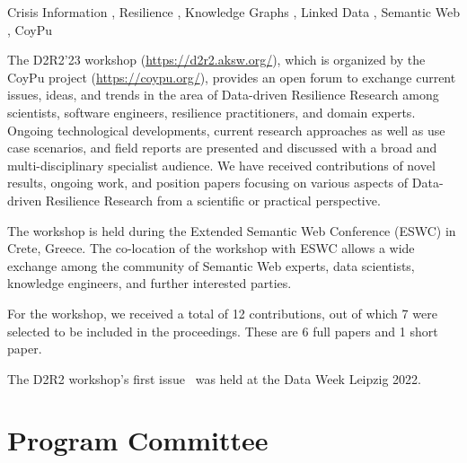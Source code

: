 \documentclass{ceurart}
\begin{document}
\begin{keywords}
  Crisis Information \sep
  Resilience \sep
  Knowledge Graphs \sep
  Linked Data \sep
  Semantic Web \sep
  CoyPu
\end{keywords}

\maketitle


The D2R2’23 workshop (\url{https://d2r2.aksw.org/}), which is organized by the CoyPu project (\url{https://coypu.org/}), provides an open forum to exchange current issues, ideas, and trends in the area of Data-driven Resilience Research among scientists, software engineers, resilience practitioners, and domain experts. Ongoing technological developments, current research approaches as well as use case scenarios, and field reports are presented and discussed with a broad and multi-disciplinary specialist audience. We have received contributions of novel results, ongoing work, and position papers focusing on various aspects of Data-driven Resilience Research from a scientific or practical perspective.

The workshop is held during the Extended Semantic Web Conference (ESWC) in Crete, Greece.
The co-location of the workshop with ESWC allows a wide exchange among the community of Semantic Web experts, data scientists, knowledge engineers, and further interested parties.

For the workshop, we received a total of 12 contributions, out of which 7 were selected to be included in the proceedings. These are 6 full papers and 1 short paper.

The D2R2 workshop's first issue~\cite{D2R2-22} was held at the Data Week Leipzig 2022.

\section*{Program Committee}
\end{document}
